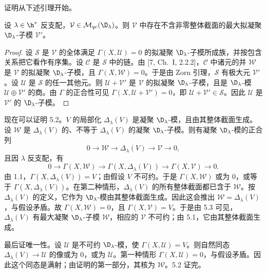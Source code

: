 证明从下述引理开始。

\begin{lemma}\label{lem:03.5.3}
设 $\lambda\in\h^*$ 反支配，$\mathcal{V}\in\mathcal{M}_{qc}(\D_\lambda)$。则 $\mathcal{V}$ 中存在不含非零整体截面的最大拟凝聚 $\D_\lambda$-子模 $\mathcal{V}'$。
\end{lemma}

\begin{proof}
设 $\mathcal{S}$ 是 $\mathcal{V}$ 的全体满足 $\Gamma(X,\mathcal{U})=0$ 的拟凝聚 $\D_\lambda$-子模所成族，并按包含关系把它看作有序集。设 $\mathcal{C}$ 是 $\mathcal{S}$ 中的链。由 [7, Ch.~I, 2.2.2]，$\mathcal{C}$ 中诸元的并 $\mathcal{W}$ 是 $\mathcal{V}$ 的拟凝聚 $\D_\lambda$-子模，且 $\Gamma(X,\mathcal{W})=0$。于是由 Zorn 引理，$\mathcal{S}$ 有极大元 $\mathcal{V}'$。设 $\mathcal{U}$ 是 $\mathcal{S}$ 的任一其他元。则 $\mathcal{U}+\mathcal{V}'$ 是 $\mathcal{V}$ 的拟凝聚 $\D_\lambda$-子模，且是 $\D_\lambda$-模 $\mathcal{U}\oplus\mathcal{V}'$ 的商。由 $\Gamma$ 的正合性可见 $\Gamma(X,\mathcal{U}+\mathcal{V}')=0$，即 $\mathcal{U}+\mathcal{V}'\in\mathcal{S}$。因此 $\mathcal{U}$ 是 $\mathcal{V}'$ 的 $\D_\lambda$-子模。
\end{proof}

现在可以证明 5.2。$V$ 的局部化 $\Delta_\lambda(V)$ 是凝聚 $\D_\lambda$-模，且由其整体截面生成。设 $\mathcal{W}$ 是 $\Delta_\lambda(V)$ 的、不等于 $\Delta_\lambda(V)$ 的凝聚 $\D_\lambda$-子模。则有凝聚 $\D_\lambda$-模的正合列
$$0\longrightarrow\mathcal{W}\longrightarrow\Delta_\lambda(V)\longrightarrow\mathcal{V}\longrightarrow 0,$$
且因 $\lambda$ 反支配，有
$$0\longrightarrow\Gamma(X,\mathcal{W})\longrightarrow\Gamma(X,\Delta_\lambda(V))\longrightarrow\Gamma(X,\mathcal{V})\longrightarrow 0.$$
由 1.1，$\Gamma(X,\Delta_\lambda(V))=V$；由假设 $V$ 不可约。于是 $\Gamma(X,\mathcal{W})$ 或为 $0$，或等于 $\Gamma(X,\Delta_\lambda(V))$。在第二种情形，$\Delta_\lambda(V)$ 的所有整体截面都已含于 $\mathcal{W}$。按 $\Delta_\lambda(V)$ 的定义，它作为 $\D_\lambda$-模由其整体截面生成。因此这会推出 $\mathcal{W}=\Delta_\lambda(V)$，与假设矛盾。故 $\Gamma(X,\mathcal{W})=0$，且 $\Gamma(X,\mathcal{V})=V$。于是由 5.3 可见，$\Delta_\lambda(V)$ 有最大凝聚 $\D_\lambda$-子模 $\mathcal{W}$，相应的 $\mathcal{V}$ 不可约；由 5.1，它由其整体截面生成。

最后证唯一性。设 $\mathcal{U}$ 是不可约 $\D_\lambda$-模，使 $\Gamma(X,\mathcal{U})=V$。则自然同态 $\Delta_\lambda(V)\to\mathcal{U}$ 的像或为 $0$，或为 $\mathcal{U}$。第一种情形 $\Gamma(X,\mathcal{U})=0$，与假设矛盾。因此这个同态是满射；由证明的第一部分，其核为 $\mathcal{W}$。5.2 证完。

